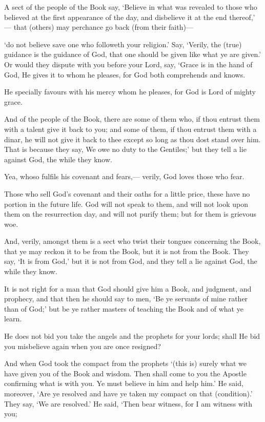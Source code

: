 \documentclass[fontsize=14pt, letterpaper, notitlepage, openany, DIV=12]{scrbook} %
\begin{document}
\noindent[3:72]
A sect of the people of the Book say, `Believe in what was revealed to those who
believed at the first appearance of the day, and disbelieve it at the end thereof,' --- that (others)
may perchance go back (from their faith)---

\noindent[3:73]
`do not believe save one who followeth your religion.' Say, `Verily, the (true) guidance is
the guidance of God, that one should be given like what ye are given.' Or would they dispute
with you before your Lord, say, `Grace is in the hand of God, He gives it to whom he pleases, for
God both comprehends and knows.

\noindent[3:74]
He specially favours with his mercy whom he pleases, for God is Lord of mighty grace.

\noindent[3:75]
And of the people of the Book, there are some of them who, if thou entrust them with a
talent give it back to you; and some of them, if thou entrust them with a dinar, he will not give it
back to thee except so long as thou dost stand over him. That is because they say, We owe no
duty to the Gentiles;' but they tell a lie against God, the while they know.

\noindent[3:76]
Yea, whoso fulfils his covenant and fears,--- verily, God loves those who fear.

\noindent[3:77]
Those who sell God's covenant and their oaths for a little price, these have no portion in
the future life. God will not speak to them, and will not look upon them on the resurrection day,
and will not purify them; but for them is grievous woe.

\noindent[3:78]
And, verily, amongst them is a sect who twist their tongues concerning the Book, that ye
may reckon it to be from the Book, but it is not from the Book. They say, `It is from God,' but it
is not from God, and they tell a lie against God, the while they know.

\noindent[3:79]
It is not right for a man that God should give him a Book, and judgment, and prophecy,
and that then he should say to men, `Be ye servants of mine rather than of God;' but be ye rather
masters of teaching the Book and of what ye learn.

\noindent[3:80]
He does not bid you take the angels and the prophets for your lords; shall He bid you
misbelieve again when you are once resigned?

\noindent[3:81]
And when God took the compact from the prophets `(this is) surely what we have given
you of the Book and wisdom. Then shall come to you the Apostle confirming what is with you.
Ye must believe in him and help him.' He said, moreover, `Are ye resolved and have ye taken
my compact on that (condition).' They say, `We are resolved.' He said, `Then bear witness, for I
am witness with you;
\end{document}

